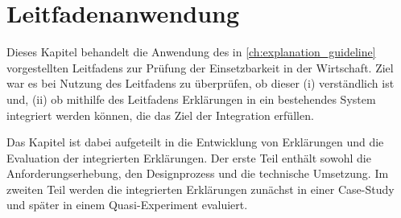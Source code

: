 \chapter{Leitfadenanwendung}
\label{sec:model_evaluation}

Dieses Kapitel behandelt die Anwendung des in \autoref{ch:explanation_guideline} vorgestellten Leitfadens zur Prüfung der Einsetzbarkeit in der Wirtschaft. Ziel war es bei Nutzung des Leitfadens zu überprüfen, ob dieser (i) verständlich ist und, (ii) ob mithilfe des Leitfadens Erklärungen in ein bestehendes System integriert werden können, die das Ziel der Integration erfüllen.

Das Kapitel ist dabei aufgeteilt in die Entwicklung von Erklärungen und die Evaluation der integrierten Erklärungen. Der erste Teil enthält sowohl die Anforderungserhebung, den Designprozess und die technische Umsetzung. Im zweiten Teil werden die integrierten Erklärungen zunächst in einer Case-Study und später in einem Quasi-Experiment evaluiert.



